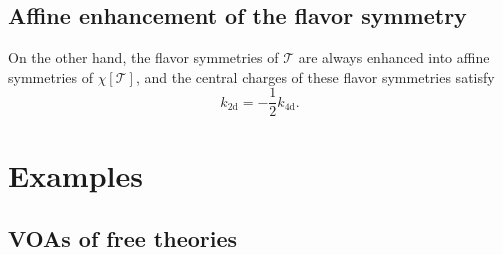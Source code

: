 \documentclass[a4paper,11pt]{article}
\begin{document}
\subsection{Affine enhancement of the flavor symmetry}
On the other hand, the flavor symmetries of $\mathcal{T}$ are always enhanced into affine symmetries of $\chi[\mathcal{T}]$, and the central charges of these flavor symmetries satisfy
\begin{equation}
    k_\mathrm{2d} = -\frac{1}{2} k_\mathrm{4d}.
\end{equation}

\section{Examples}
\subsection{VOAs of free theories}













\end{document}
